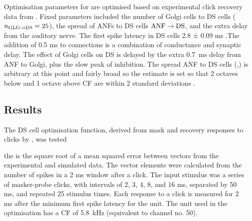 % 

\smallskip{}

Optimisation parameters for \GLGDS are optimised based on experimental click
recovery data from \citep{BackoffPalombiEtAl:1997}.  Fixed parameters included
the number of Golgi cells to DS cells ($\protect n_{\protect\textrm{{GLG}}\to\textrm{{DS}}} = 25$), the spread of ANFs to DS
cells $\protect\textrm{{ANF}}\to\textrm{{DS}}$, and the extra delay from the auditory nerve.  The first spike
latency in DS cells 2.8 ± 0.09 ms \citep{RhodeSmith:1986}.The addition of 0.5 ms
to \ANFDS connections is a combination of conductance and synaptic delay. The
effect of Golgi cells on DS is delayed by the extra 0.7~ms delay from ANF to
Golgi, plus the slow peak of \GABAa inhibition.  The spread ANF to DS cells
(\sANFDSh,\sANFDSl) is arbitrary at this point and fairly broad so the estimate
is set so that 2 octaves below and 1 octave above CF are within 2 standard
deviations \citep{PaoliniClark:1999}.





\subsection{Results}\label{sec:DS:results}

The DS cell optimisation function, derived from mask and recovery responses to clicks by \citet{BackoffPalombiEtAl:1997}, was tested 


the is the square root of a mean squared error between vectors from the
experimental and simulated data. The vector elements were calculated from the
number of spikes in a 2 ms window after a click.  The input stimulus was a
series of masker-probe clicks, with intervals of 2, 3, 4, 8, and 16 ms,
separated by 50 ms, and repeated 25 stimulus times. Each response to a click is
measured for 2 ms after the minimum first spike latency for the unit.  The unit
used in the optimisation has a CF of 5.8~kHz (equivalent to channel no. 50).


\smallskip{}

